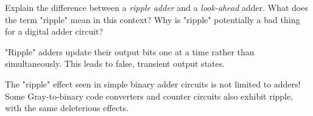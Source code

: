 

Explain the difference between a {\it ripple adder} and a {\it look-ahead} adder.  What does the term "ripple" mean in this context?  Why is "ripple" potentially a bad thing for a digital adder circuit?







"Ripple" adders update their output bits one at a time rather than simultaneously.  This leads to false, transient output states.







The "ripple" effect seen in simple binary adder circuits is not limited to adders!  Some Gray-to-binary code converters and counter circuits also exhibit ripple, with the same deleterious effects.




